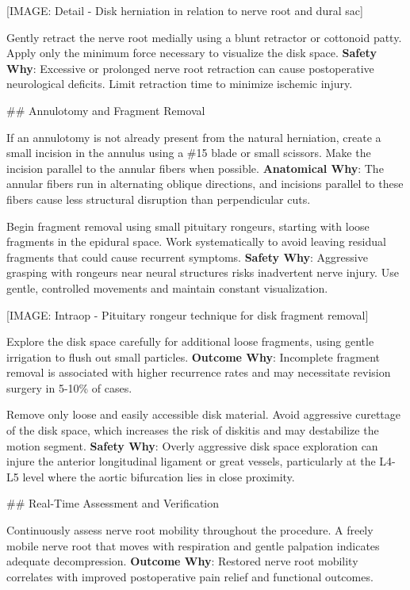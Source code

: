 \documentclass[12pt,a4paper]{article}
\begin{document}
[IMAGE: Detail - Disk herniation in relation to nerve root and dural sac]

Gently retract the nerve root medially using a blunt retractor or cottonoid patty. Apply only the minimum force necessary to visualize the disk space. \textbf{Safety Why}: Excessive or prolonged nerve root retraction can cause postoperative neurological deficits. Limit retraction time to minimize ischemic injury.

\#\# Annulotomy and Fragment Removal

If an annulotomy is not already present from the natural herniation, create a small incision in the annulus using a \#15 blade or small scissors. Make the incision parallel to the annular fibers when possible. \textbf{Anatomical Why}: The annular fibers run in alternating oblique directions, and incisions parallel to these fibers cause less structural disruption than perpendicular cuts.

Begin fragment removal using small pituitary rongeurs, starting with loose fragments in the epidural space. Work systematically to avoid leaving residual fragments that could cause recurrent symptoms. \textbf{Safety Why}: Aggressive grasping with rongeurs near neural structures risks inadvertent nerve injury. Use gentle, controlled movements and maintain constant visualization.

[IMAGE: Intraop - Pituitary rongeur technique for disk fragment removal]

Explore the disk space carefully for additional loose fragments, using gentle irrigation to flush out small particles. \textbf{Outcome Why}: Incomplete fragment removal is associated with higher recurrence rates and may necessitate revision surgery in 5-10\% of cases.

Remove only loose and easily accessible disk material. Avoid aggressive curettage of the disk space, which increases the risk of diskitis and may destabilize the motion segment. \textbf{Safety Why}: Overly aggressive disk space exploration can injure the anterior longitudinal ligament or great vessels, particularly at the L4-L5 level where the aortic bifurcation lies in close proximity.

\#\# Real-Time Assessment and Verification

Continuously assess nerve root mobility throughout the procedure. A freely mobile nerve root that moves with respiration and gentle palpation indicates adequate decompression. \textbf{Outcome Why}: Restored nerve root mobility correlates with improved postoperative pain relief and functional outcomes.
\end{document}
